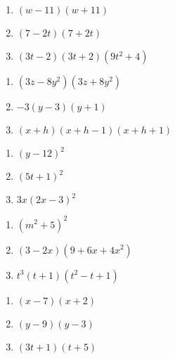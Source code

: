\documentclass[11pt]{article}
\theoremstyle{definition}  %
\newcounter{HW}
\begin{document}
\begin{multicols}{3}
\begin{enumerate}
\setcounter{enumi}{\value{HW}}

\item $(w-11)(w+11)$
\item $(7-2t)(7+2t)$
\item $(3t-2)(3t+2)(9t^2+4)$

\setcounter{HW}{\value{enumi}}
\end{enumerate}
\end{multicols}

\begin{multicols}{3}
\begin{enumerate}
\setcounter{enumi}{\value{HW}}

\item $(3z-8y^2)(3z+8y^2)$
\item $-3(y - 3)(y+1)$
\item $(x+h)(x+h-1)(x+h+1)$

\setcounter{HW}{\value{enumi}}
\end{enumerate}
\end{multicols}

\begin{multicols}{3}
\begin{enumerate}
\setcounter{enumi}{\value{HW}}

\item $(y-12)^2$
\item $(5t+1)^2$
\item $3x(2x-3)^2$

\setcounter{HW}{\value{enumi}}
\end{enumerate}
\end{multicols}

\begin{multicols}{3}
\begin{enumerate}
\setcounter{enumi}{\value{HW}}

\item $(m^2+5)^2$
\item $(3-2x)(9 + 6x + 4x^2)$
\item $t^3(t+1)(t^2 - t + 1)$


\setcounter{HW}{\value{enumi}}
\end{enumerate}
\end{multicols}



\begin{multicols}{3}
\begin{enumerate}
\setcounter{enumi}{\value{HW}}

\item $(x-7)(x+2)$
\item $(y-9)(y-3)$
\item $(3t+1)(t+5)$


\setcounter{HW}{\value{enumi}}
\end{enumerate}
\end{multicols}
\end{document}
